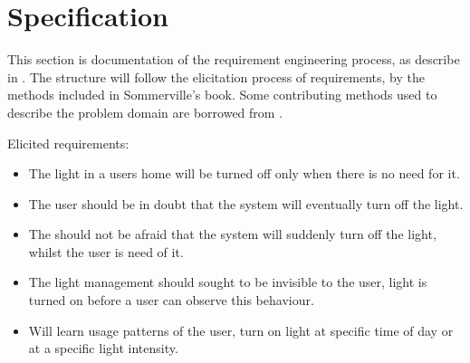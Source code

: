 \section{Specification}

This section is documentation of the requirement engineering process, as describe in \cite{sommerville}. The structure will follow the elicitation process of requirements, by the methods included in Sommerville's book. Some contributing methods used to describe the problem domain are borrowed from \cite{OOAD}.














Elicited requirements: %

\begin{itemize}
  \item The light in a users home will be turned off only when there is no need for it.
  \item The user should be in doubt that the system will eventually turn off the light.
  \item The should not be afraid that the system will suddenly turn off the light, whilst the user is need of it.
  \item The light management should sought to be invisible to the user, light is turned on before a user can observe this behaviour.
  \item Will learn usage patterns of the user, turn on light at specific time of day or at a specific light intensity.
\end{itemize}
